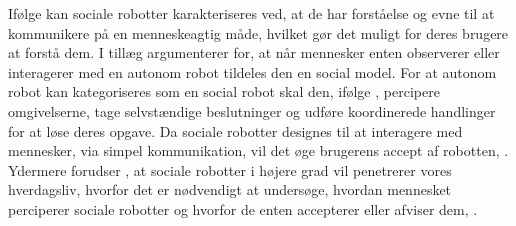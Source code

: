 Ifølge \textcite[s. 1]{PDF:SharingALifeHarvey} kan sociale robotter karakteriseres ved, at de har forståelse og evne til at kommunikere på en menneskeagtig måde, hvilket gør det muligt for deres brugere at forstå dem. I tillæg argumenterer \textcite[s. 168]{PDF:TowardSociableRobots} for, at når mennesker enten observerer eller interagerer med en autonom robot tildeles den en social model. For at autonom robot kan kategoriseres som en social robot skal den, ifølge \textcite[s. 168]{PDF:TowardSociableRobots}, percipere omgivelserne, tage selvstændige beslutninger og udføre koordinerede handlinger for at løse deres opgave. Da sociale robotter designes til at interagere med mennesker, via simpel kommunikation, vil det øge brugerens accept af robotten, \parencite[s. 1476]{PDF:ExploringInfluencingVariable}. Ydermere forudser \textcite[s. 1476]{PDF:ExploringInfluencingVariable}, at sociale robotter i højere grad vil penetrerer vores hverdagsliv, hvorfor det er nødvendigt at undersøge, hvordan mennesket perciperer sociale robotter og hvorfor de enten accepterer eller afviser dem, \parencite[s. 1]{PDF:SharingALifeHarvey}.  



